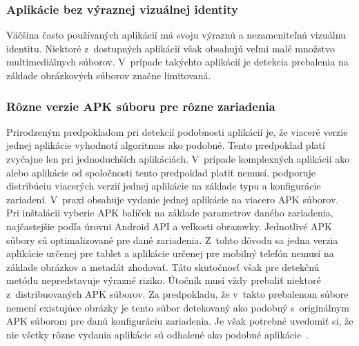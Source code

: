 \subsubsection{\textbf{Aplikácie bez výraznej vizuálnej identity}}
Väčšina často používaných aplikácií má svoju výraznú a nezameniteľnú vizuálnu identitu. Niektoré z~dostupných aplikácií však obsahujú veľmi malé množstvo multimediálnych súborov. V~prípade takýchto aplikácií je detekcia prebalenia na základe obrázkových súborov značne limitovaná.

\subsubsection{\textbf{Rôzne verzie APK súboru pre rôzne zariadenia}}
Prirodzeným predpokladom pri detekcií podobnosti aplikácií je, že viaceré verzie jednej aplikácie vyhodnotí algoritmus ako podobné. Tento predpoklad platí zvyčajne len pri jednoduchších aplikáciách. V~prípade komplexných aplikácií ako  alebo  aplikácie od spoločnosti  tento predpoklad platiť nemusí.  podporuje distribúciu viacerých verzií jednej aplikácie na základe typu a konfigurácie zariadení. V~praxi obsahuje vydanie jednej aplikácie na  viacero APK súborov. Pri inštalácii vyberie  APK balíček na základe parametrov daného zariadenia, najčastejšie podľa úrovni Android API a veľkosti obrazovky. Jednotlivé APK súbory sú optimalizované pre dané zariadenia. Z~tohto dôvodu sa jedna verzia aplikácie určenej pre tablet a aplikácie určenej pre mobilný telefón nemusí na základe obrázkov a metadát zhodovať. 
Táto skutočnosť však pre detekčnú metódu nepredstavuje výrazné riziko. Útočník musí vždy prebaliť niektoré z~distribuovaných APK súborov. Za predpokladu, že v~takto prebalenom súbore nemení existujúce obrázky je tento súbor detekovaný ako podobný s~originálnym APK súborom pre danú konfiguráciu zariadenia. Je však potrebné uvedomiť si, že nie všetky rôzne vydania aplikácie sú odhalené ako podobné aplikácie~\cite{MultipleApks}.

